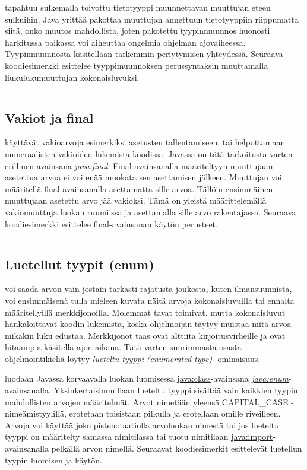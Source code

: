 \documentclass{tufte-book}
\newcommand{\eng}[1]{\textit{(#1)}}
\newcommand{\new}[1]{\textit{\gls{#1}}}
\newcommand{\neweng}[2]{\new{#1} \eng{#2}}
\newcommand{\java}[1]{\underline{\gls{java:#1}}}
\newcommand{\newjava}[1]{\textit{\java{#1}}}
\newcommand{\code}[3]{
\begin{listing}
    \inputminted{java}{OhjelmointiopasEsimerkit/src/#1/#2.java}
    \caption{#3}
    \label{Java-#1-#2}
\end{listing}
}
\begin{document}
 tapahtuu sulkemalla toivottu tietotyyppi muunnettavan
muuttujan eteen sulkuihin. Java yrittää pakottaa muuttujan annettuun tietotyyppiin riippumatta
siitä, onko muutos mahdollista, joten pakotettu tyypinmuunnos huonosti harkitussa paikassa voi
aiheuttaa ongelmia ohjelman ajovaiheessa. Tyypinmuunnosta käsitellään tarkemmin periytymisen
yhteydessä. Seuraava koodiesimerkki esittelee tyyppimuunnoksen perussyntaksin muuttamalla
liukulukumuuttujan kokonaisluvuksi.

\code{week3/basicexamples}{Casting}{Tyyppimuunnos primitiivisestä tietotyypistä toiseen Javassa}

\subsection{Vakiot ja final}
\label{final}

 käyttävät vakioarvoja esimerkiksi asetusten tallentamiseen, tai
helpottamaan numeraalisten vakioiden lukemista koodissa. Javassa on tätä tarkoitusta varten
erillinen avainsana \newjava{final}. Final-avainsanalla määriteltyyn muuttujaan asetettua arvoa ei
voi enää muokata sen asettamisen jälkeen. Muuttujan voi määritellä final-avainsanalla asettamatta
sille arvoa. Tällöin ensimmäinen muuttujaan asetettu arvo jää vakioksi. Tämä on yleistä
määrittelemällä vakiomuuttuja luokan ruumiissa ja asettamalla sille arvo rakentajassa. Seuraava
koodiesimerkki esittelee final-avainsanan käytön perusteet.

\code{week3/basicexamples}{FinalUsage}{\java{final}-avainsanan käyttö Javassa}

\subsection{Luetellut tyypit (enum)}
\label{enum}

 voi saada arvon vain jostain tarkasti rajatusta joukosta, kuten
ilmansuunnista, voi ensimmäisenä tulla mieleen kuvata näitä arvoja kokonaisluvuilla tai ennalta
määritellyillä merkkijonoilla. Molemmat tavat toimivat, mutta kokonaisluvut hankaloittavat koodin
lukemista, koska ohjelmoijan täytyy muistaa mitä arvoa mikäkin luku edustaa. Merkkijonot taas ovat
alttiita kirjoitusvirheille ja ovat hitaampia käsitellä ajon aikana. Tätä varten suurimmasta
osasta ohjelmointikieliä löytyy \neweng{lueteltu tyyppi}{enumerated type} -ominaisuus.

 luodaan Javassa korvaavalla luokan luomisessa \java{class}-avainsana
\newjava{enum}-avainsanalla. Yksinkertaisimmillaan lueteltu tyyppi sisältää vain kaikkien tyypin
mahdollisten arvojen määritelmät. Arvot nimetään yleensä CAPITAL\_CASE -nimeämistyylillä,
erotetaan toisistaan pilkulla ja erotellaan omille riveilleen. Arvoja voi käyttää joko
pistenotaatiolla arvoluokan nimestä tai jos lueteltu tyyppi on määritelty samassa nimitilassa
tai tuotu nimitilaan \java{import}-avainsanalla pelkällä arvon nimellä. Seuraavat koodiesimerkit
esittelevät luetellun tyypin luomisen ja käytön.
\end{document}

